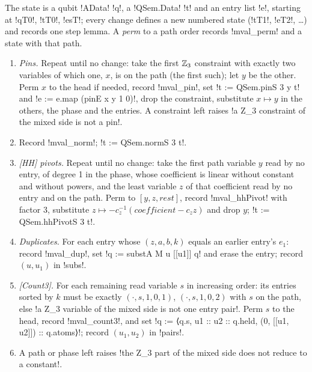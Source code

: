{{{\begin{algorithm}\label{alg:lean-export-z3}
The state is a qubit \lexlean!AData! \lexcode!q!, a \lexlean!QSem.Data! \lexcode!t! and an entry list
\lexcode!e!, starting at \lexlean!qT0!, \lexlean!tT0!, \lexlean!esT!; every change defines a new numbered
state (\lexlean!tT1!, \lexlean!eT2!, \ldots) and records one step lemma. A \emph{perm} to a path
order records \lexlean!mval_perm! and a state with that path.
\begin{enumerate}
\item \emph{Pins.} Repeat until no change: take the first $\mathbb{Z}_3$ constraint with exactly two
variables of which one, $x$, is on the path (the first such); let $y$ be the other. Perm $x$ to
the head if needed, record \lexlean!mval_pin!, set \lexlean!t := QSem.pinS 3 y t! and
\lexlean!e := e.map (pinE x y 1 0)!, drop the constraint, substitute $x \mapsto y$ in the others,
the phase and the entries. A constraint left raises
\lexcode!a Z_3 constraint of the mixed side is not a pin!.
\item Record \lexlean!mval_norm!; \lexlean!t := QSem.normS 3 t!.
\item \emph{[HH] pivots.} Repeat until no change: take the first path variable $y$ read by no
entry, of degree 1 in the phase, whose coefficient is linear without constant and without
powers, and the least variable $z$ of that coefficient read by no entry and on the path. Perm
to $[y, z, \mathit{rest}]$, record \lexlean!mval_hhPivot! with factor 3, substitute
$z \mapsto -c_z^{-1}(\mathit{coefficient} - c_z z)$ and drop $y$; \lexlean!t := QSem.hhPivotS 3 t!.
\item \emph{Duplicates.} For each entry whose $(z, a, b, k)$ equals an earlier entry's $e_1$:
record \lexlean!mval_dup!, set \lexlean!q := substA M u [[u1]] q! and erase the entry; record
$(u, u_1)$ in \lexcode!subs!.
\item \emph{[Count3].} For each remaining read variable $s$ in increasing order: its entries
sorted by $k$ must be exactly $(\cdot, s, 1, 0, 1)$, $(\cdot, s, 1, 0, 2)$ with $s$ on the
path, else \lexcode!a Z_3 variable of the mixed side is not one entry pair!. Perm $s$ to the
head, record \lexlean!mval_count3!, and set \lexlean!q := ⟨q.s, u1 :: u2 :: q.held, (0, [[u1, u2]]) :: q.atoms⟩!;
record $(u_1, u_2)$ in \lexcode!pairs!.
\item A path or phase left raises
\lexcode!the Z_3 part of the mixed side does not reduce to a constant!.
\end{enumerate}

\end{algorithm}}}}
